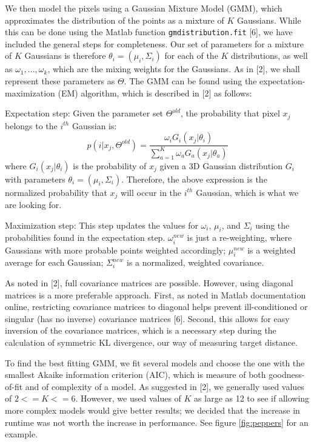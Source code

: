 \documentclass[10pt,twocolumn,letterpaper]{article}
\begin{document}
We then model the pixels using a Gaussian Mixture Model (GMM), which approximates the distribution of the points as a mixture of $K$ Gaussians. While this can be done using the Matlab function \texttt{gmdistribution.fit} [6], we have included the general steps for completeness. Our set of parameters for a mixture of $K$ Gaussians is therefore $\theta_i = (\mu_i, \Sigma_i)$ for each of the $K$ distributions, as well as $\omega_1, ..., \omega_k$, which are the mixing weights for the Gaussians. As in [2], we shall represent these parameters as $\Theta$. The GMM can be found using the expectation-maximization (EM) algorithm, which is described in [2] as follows: 

Expectation step: Given the parameter set $\Theta^{old}$, the probability that pixel $x_j$ belongs to the $i^{th}$ Gaussian is:
\[
  p(i | x_j, \Theta^{old}) = \frac{\omega_i G_i(x_j | \theta_i)}{\sum_{a=1}^K \omega_a G_a(x_j | \theta_a)}
\]
where $G_i(x_j | \theta_i)$ is the probability of $x_j$ given a 3D Gaussian distribution $G_i$ with parameters $\theta_i = (\mu_i, \Sigma_i)$. Therefore, the above expression is the normalized probability that $x_j$ will occur in the $i^{th}$ Gaussian, which is what we are looking for. 

Maximization step: This step updates the values for $\omega_i$, $\mu_i$, and $\Sigma_i$ using the probabilities found in the expectation step. $\omega_i^{new}$ is just a re-weighting, where Gaussians with more probable points weighted accordingly; $\mu_i^{new}$ is a weighted average for each Gaussian; $\Sigma_i^{new}$ is a normalized, weighted covariance. 

As noted in [2], full covariance matrices are possible. However, using diagonal matrices is a more preferable approach. First, as noted in Matlab documentation online, restricting covariance matrices to diagonal helps prevent ill-conditioned or singular (has no inverse) covariance matrices [6]. Second, this allows for easy inversion of the covariance matrices, which is a necessary step during the calculation of symmetric KL divergence, our way of measuring target distance. 

To find the best fitting GMM, we fit several models and choose the one with the smallest Akaike information criterion (AIC), which is measure of both goodness-of-fit and of complexity of a model. As suggested in [2], we generally used values of $2 <= K <= 6$. However, we used values of $K$ as large as 12 to see if allowing more complex models would give better results; we decided that the increase in runtime was not worth the increase in performance. See figure \ref{fig:peppers} for an example. 
\end{document}
